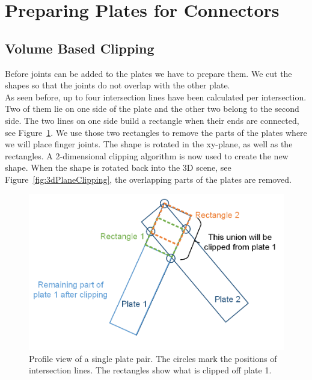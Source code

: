\documentclass[../ClassicThesis.tex]{subfiles}
\begin{document}
\section{Preparing Plates for Connectors}
\subsection{Volume Based Clipping}
Before joints can be added to the plates we have to prepare them. We cut the shapes so that the joints do not overlap with the other plate.\\
As seen before, up to four intersection lines have been calculated per intersection. Two of them lie on one side of the plate and the other two belong to the second side. The two lines on one side build a rectangle when their ends are connected, see Figure~\ref{fig:clippingPlate}. We use those two rectangles to remove the parts of the plates where we will place finger joints. The shape is rotated in the xy-plane, as well as the rectangles. A 2-dimensional clipping algorithm is now used to create the new shape. When the shape is rotated back into the 3D scene, see Figure~\ref{fig:3dPlaneClipping}, the overlapping parts of the plates are removed.
\begin{figure}[!ht]
\centering
\includegraphics[width=\columnwidth]{Images/10-joints-clippingPlate.png}
\caption{Profile view of a single plate pair. The circles mark the positions of intersection lines. The rectangles show what is clipped off plate 1. }
\label{fig:clippingPlate}
\end{figure}
\end{document}
